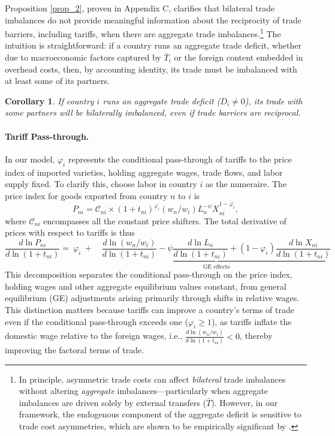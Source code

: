\documentclass[12pt]{article}
\newtheorem{crl}{Corollary}
\begin{document}
Proposition \ref{prop_2}, proven in Appendix C, clarifies that bilateral trade imbalances do not provide meaningful information about the reciprocity of trade barriers, including tariffs, when there are aggregate trade imbalances.\footnote{In principle, asymmetric trade costs can affect \textit{bilateral} trade imbalances without altering \textit{aggregate} imbalances---particularly when aggregate imbalances are driven solely by external transfers ($\bar{T}$). However, in our framework, the endogenous component of the aggregate deficit is sensitive to trade cost asymmetries, which are shown to be empirically significant by \citet{cunat2024bilateral}.} The intuition is straightforward: if a country runs an aggregate trade deficit, whether due to macroeconomic factors captured by $\bar{T}_i$ or the foreign content embedded in overhead costs, then, by accounting identity, its trade must be imbalanced with at least some of its partners.  

\begin{crl}
If country $i$ runs an aggregate trade deficit ($D_i\neq0$), its trade with some partners will be bilaterally imbalanced, even if trade barriers are reciprocal.
\end{crl}
 
\paragraph{Tariff Pass-through.}
In our model, $\varphi_i$  represents the conditional pass-through of tariffs to the price index of imported varieties, holding aggregate wages, trade flows, and labor supply fixed. To clarify this, choose labor in country $i$ as the numeraire. The price index for goods exported from country $n$ to $i$ is
\[
P_{ni}=\mathcal{C}_{ni}\times(1+t_{ni})^{\varphi_{i}}\left(w_{n}/w_{i}\right)L_{n}^{-\psi}X_{ni}^{1-\varphi_{i}},
\]
where $\mathcal{C}_{ni}$ encompasses all the constant price shifters. The total derivative of prices with respect to tariffs is thus 
\[
\frac{d\ln P_{ni}}{d\ln(1+t_{ni})}=\ \varphi_i \ +\quad\underbrace{\frac{d\ln\left(w_{n}/w_{i}\right)}{d\ln(1+t_{ni})}-\psi\frac{d\ln L_{n}}{d\ln(1+t_{ni})} + (1-\varphi_{i})\frac{d\ln X_{ni}}{d\ln(1+t_{ni})}}_{\text{GE effects}}
\]
This decomposition separates the conditional pass-through on the price index, holding wages and other aggregate equilibrium values constant, from general equilibrium (GE) adjustments arising primarily through shifts in relative wages. This distinction matters because tariffs can improve a country's terms of trade even if the conditional pass-through exceeds one ($\varphi_i \geq 1$), as tariffs inflate the domestic wage relative to the foreign wages, i.e., $\frac{d\ln\left(w_{n}/w_{i}\right)}{d\ln(1+t_{ni})}<0$, thereby improving the factoral terms of trade.
\end{document}
